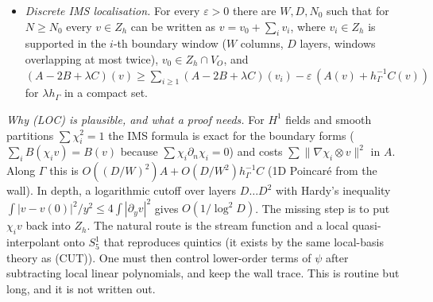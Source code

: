 \documentclass[11pt]{article}
\theoremstyle{definition}
\theoremstyle{remark}
\newcommand{\hG}{h_\Gamma}
\newcommand{\Zh}{Z_h}
\newcommand{\norm}[1]{\|#1\|}
\newcommand{\dn}{\partial_n}
\begin{document}
\begin{itemize}
\item[(LOC)] \emph{Discrete IMS localisation.} For every $\varepsilon>0$ there are $W,D,N_0$ such that for $N\ge N_0$ every $v\in\Zh$ can be written as $v=v_0+\sum_iv_i$, where $v_i\in\Zh$ is supported in the $i$-th boundary window ($W$ columns, $D$ layers, windows overlapping at most twice), $v_0\in\Zh\cap V_O$, and
$(A-2B+\lambda C)(v)\ge\sum_{i\ge1}(A-2B+\lambda C)(v_i)-\varepsilon\,(A(v)+\hG^{-1}C(v))$ for $\lambda\hG$ in a compact set.
\end{itemize}
\emph{Why (LOC) is plausible, and what a proof needs.} For $H^1$ fields and smooth partitions $\sum\chi_i^2=1$ the IMS formula is exact for the boundary forms ($\sum_iB(\chi_iv)=B(v)$ because $\sum\chi_i\dn\chi_i=0$) and costs $\sum\norm{\nabla\chi_i\otimes v}^2$ in $A$. Along $\Gamma$ this is $O((D/W)^2)A+O(D/W^2)\hG^{-1}C$ (1D Poincar\'e from the wall). In depth, a logarithmic cutoff over layers $D\dots D^2$ with Hardy's inequality $\int|v-v(0)|^2/y^2\le4\int|\partial_yv|^2$ gives $O(1/\log^2D)$. The missing step is to put $\chi_iv$ back into $\Zh$. The natural route is the stream function and a local quasi-interpolant onto $S^1_5$ that reproduces quintics (it exists by the same local-basis theory as (CUT)). One must then control lower-order terms of $\psi$ after subtracting local linear polynomials, and keep the wall trace. This is routine but long, and it is not written out.
\end{document}
